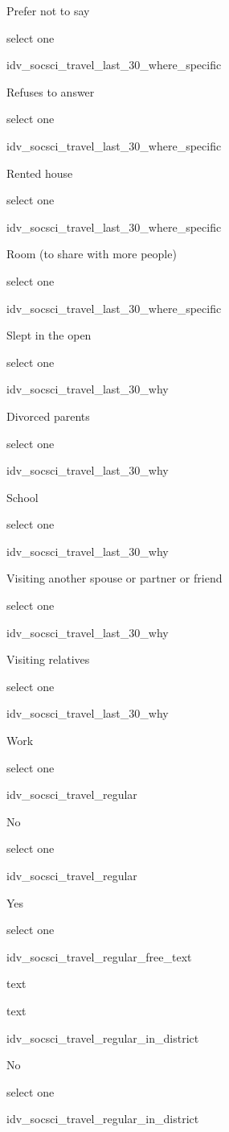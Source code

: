 \documentclass[]{article}
\begin{document}
Prefer not to say

select one

idv\_socsci\_travel\_last\_30\_where\_specific

Refuses to answer

select one

idv\_socsci\_travel\_last\_30\_where\_specific

Rented house

select one

idv\_socsci\_travel\_last\_30\_where\_specific

Room (to share with more people)

select one

idv\_socsci\_travel\_last\_30\_where\_specific

Slept in the open

select one

idv\_socsci\_travel\_last\_30\_why

Divorced parents

select one

idv\_socsci\_travel\_last\_30\_why

School

select one

idv\_socsci\_travel\_last\_30\_why

Visiting another spouse or partner or friend

select one

idv\_socsci\_travel\_last\_30\_why

Visiting relatives

select one

idv\_socsci\_travel\_last\_30\_why

Work

select one

idv\_socsci\_travel\_regular

No

select one

idv\_socsci\_travel\_regular

Yes

select one

idv\_socsci\_travel\_regular\_free\_text

text

text

idv\_socsci\_travel\_regular\_in\_district

No

select one

idv\_socsci\_travel\_regular\_in\_district
\end{document}
